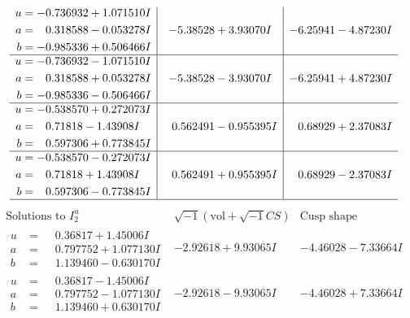 \documentclass[1p]{elsarticle_modified}
\theoremstyle{definition}
\newcommand{\I}{\sqrt{-1}}
\begin{document}
$$\begin{array}{c|c|c}
\begin{aligned}
u &= -0.736932 + 1.071510 I \\
a &= \phantom{-}0.318588 - 0.053278 I \\
b &= -0.985336 + 0.506466 I\end{aligned}
 & -5.38528 + 3.93070 I & -6.25941 - 4.87230 I \\ \hline\begin{aligned}
u &= -0.736932 - 1.071510 I \\
a &= \phantom{-}0.318588 + 0.053278 I \\
b &= -0.985336 - 0.506466 I\end{aligned}
 & -5.38528 - 3.93070 I & -6.25941 + 4.87230 I \\ \hline\begin{aligned}
u &= -0.538570 + 0.272073 I \\
a &= \phantom{-}0.71818 - 1.43908 I \\
b &= \phantom{-}0.597306 + 0.773845 I\end{aligned}
 & \phantom{-}0.562491 - 0.955395 I & \phantom{-}0.68929 + 2.37083 I \\ \hline\begin{aligned}
u &= -0.538570 - 0.272073 I \\
a &= \phantom{-}0.71818 + 1.43908 I \\
b &= \phantom{-}0.597306 - 0.773845 I\end{aligned}
 & \phantom{-}0.562491 + 0.955395 I & \phantom{-}0.68929 - 2.37083 I\\
 \hline 
 \end{array}$$\newpage$$\begin{array}{c|c|c}  
\text{Solutions to }I^u_{2}& \I (\text{vol} + \sqrt{-1}CS) & \text{Cusp shape}\\
 \hline 
\begin{aligned}
u &= \phantom{-}0.36817 + 1.45006 I \\
a &= \phantom{-}0.797752 + 1.077130 I \\
b &= \phantom{-}1.139460 - 0.630170 I\end{aligned}
 & -2.92618 + 9.93065 I & -4.46028 - 7.33664 I \\ \hline\begin{aligned}
u &= \phantom{-}0.36817 - 1.45006 I \\
a &= \phantom{-}0.797752 - 1.077130 I \\
b &= \phantom{-}1.139460 + 0.630170 I\end{aligned}
 & -2.92618 - 9.93065 I & -4.46028 + 7.33664 I \\ \hline\begin{aligned}

\end{aligned}
\end{array}$$
\end{document}
